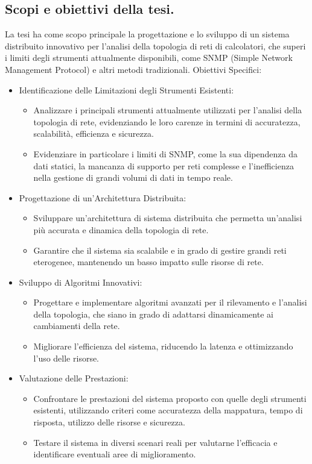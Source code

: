 \documentclass[target=bach,aauheader=,style=]{thud}
\begin{document}
\subsection{Scopi e obiettivi della tesi.}
La tesi ha come scopo principale la progettazione e lo sviluppo di un sistema distribuito innovativo per l'analisi della topologia di reti di calcolatori, che superi i limiti degli strumenti attualmente disponibili, come SNMP (Simple Network Management Protocol) e altri metodi tradizionali.
Obiettivi Specifici:
\begin{itemize}
  \item Identificazione delle Limitazioni degli Strumenti Esistenti:
    \begin{itemize}
      \item Analizzare i principali strumenti attualmente utilizzati per l'analisi della topologia di rete, evidenziando le loro carenze in termini di accuratezza, scalabilità, efficienza e sicurezza.
    \item Evidenziare in particolare i limiti di SNMP, come la sua dipendenza da dati statici, la mancanza di supporto per reti complesse e l'inefficienza nella gestione di grandi volumi di dati in tempo reale.
    \end{itemize}

  \item Progettazione di un'Architettura Distribuita:
    \begin{itemize}
      \item Sviluppare un'architettura di sistema distribuita che permetta un'analisi più accurata e dinamica della topologia di rete.
      \item Garantire che il sistema sia scalabile e in grado di gestire grandi reti eterogenee, mantenendo un basso impatto sulle risorse di rete.
    \end{itemize}
    
  \item Sviluppo di Algoritmi Innovativi:
    \begin{itemize}
      \item Progettare e implementare algoritmi avanzati per il rilevamento e l'analisi della topologia, che siano in grado di adattarsi dinamicamente ai cambiamenti della rete.
      \item Migliorare l'efficienza del sistema, riducendo la latenza e ottimizzando l'uso delle risorse.
    \end{itemize}

  \item Valutazione delle Prestazioni:
    \begin{itemize}
      \item Confrontare le prestazioni del sistema proposto con quelle degli strumenti esistenti, utilizzando criteri come accuratezza della mappatura, tempo di risposta, utilizzo delle risorse e sicurezza.
      \item Testare il sistema in diversi scenari reali per valutarne l'efficacia e identificare eventuali aree di miglioramento.
    \end{itemize}



\end{itemize}
\end{document}
